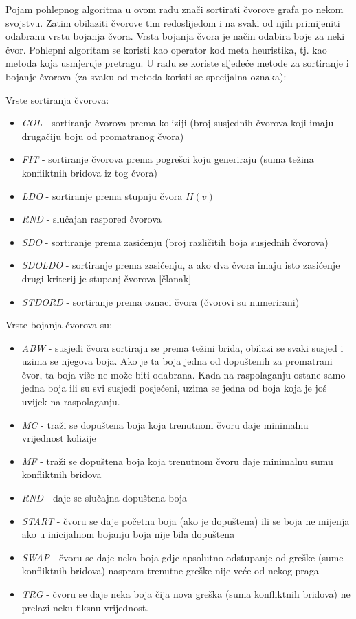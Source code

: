 \documentclass[times, utf8, diplomski, numeric]{fer}
\begin{document}
Pojam pohlepnog algoritma u ovom radu znači sortirati čvorove grafa po nekom svojstvu. Zatim obilaziti čvorove tim redoslijedom i na svaki od njih primijeniti odabranu vrstu bojanja čvora. Vrsta bojanja čvora je način odabira boje za neki čvor. Pohlepni algoritam se koristi kao operator kod meta heuristika, tj. kao metoda koja usmjeruje pretragu.
U radu se koriste sljedeće metode za sortiranje i bojanje čvorova (za svaku od metoda koristi se specijalna oznaka):

Vrste sortiranja čvorova:

\begin{itemize}
	\item \emph{COL} - sortiranje čvorova prema koliziji (broj susjednih čvorova koji imaju drugačiju boju od promatranog čvora)
	\item \emph{FIT} - sortiranje čvorova prema pogrešci koju generiraju (suma težina konfliktnih bridova iz tog čvora)
	\item \emph{LDO} - sortiranje prema stupnju čvora $H(v)$
	\item \emph{RND} - slučajan raspored čvorova
	\item \emph{SDO} - sortiranje prema zasićenju (broj različitih boja susjednih čvorova)
	\item \emph{SDOLDO} - sortiranje prema zasićenju, a ako dva čvora imaju isto zasićenje drugi kriterij je stupanj čvorova [članak]
	\item \emph{STDORD} - sortiranje prema oznaci čvora (čvorovi su numerirani)
\end{itemize}

Vrste bojanja čvorova su:

\begin{itemize}
	\item \emph{ABW} - susjedi čvora sortiraju se prema težini brida, obilazi se svaki susjed i uzima se njegova boja. Ako je ta boja jedna od dopuštenih za promatrani čvor, ta boja više ne može biti odabrana. Kada na raspolaganju ostane samo jedna boja ili su svi susjedi posjećeni, uzima se jedna od boja koja je još uvijek na raspolaganju. 
	\item \emph{MC} - traži se dopuštena boja koja trenutnom čvoru daje minimalnu vrijednost kolizije
	\item \emph{MF} - traži se dopuštena boja koja trenutnom čvoru daje minimalnu sumu konfliktnih bridova
	\item \emph{RND} - daje se slučajna dopuštena boja
	\item \emph{START} - čvoru se daje početna boja (ako je dopuštena) ili se boja ne mijenja ako u inicijalnom bojanju boja nije bila dopuštena
	\item \emph{SWAP} - čvoru se daje neka boja gdje apsolutno odstupanje od greške (sume konfliktnih bridova) naspram trenutne greške nije veće od nekog praga
	\item \emph{TRG} - čvoru se daje neka boja čija nova greška (suma konfliktnih bridova) ne prelazi neku fiksnu vrijednost. 
\end{itemize}
\end{document}
